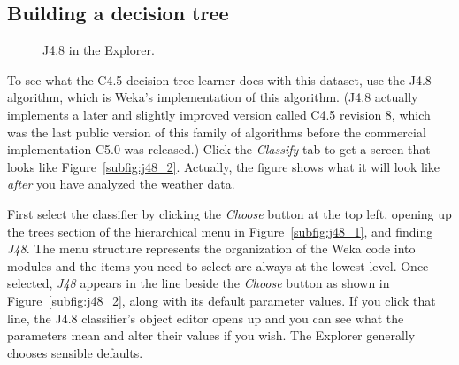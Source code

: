 \subsection{Building a decision tree}
\label{subsection:building_decision_tree}

\begin{figure}[!th]
\centering
{}
\qquad
{}
\caption{\label{fig:j48_explorer}J4.8 in the Explorer.}
\end{figure}

To see what the C4.5 decision tree learner does with this dataset, use
the J4.8 algorithm, which is Weka’s implementation of this
algorithm. (J4.8 actually implements a later and slightly improved
version called C4.5 revision 8, which was the last public version of
this family of algorithms before the commercial implementation C5.0
was released.) Click the \textit{Classify} tab to get a screen that
looks like Figure~\ref{subfig:j48_2}. Actually, the figure shows what
it will look like \textit{after} you have analyzed the weather data.

First select the classifier by clicking the \textit{Choose} button at
the top left, opening up the trees section of the hierarchical menu in
Figure~\ref{subfig:j48_1}, and finding \textit{J48}. The menu
structure represents the organization of the Weka code into modules
and the items you need to select are always at the lowest level. Once
selected, \textit{J48} appears in the line beside the \textit{Choose}
button as shown in Figure~\ref{subfig:j48_2}, along with its default parameter
values. If you click that line, the J4.8 classifier’s object editor
opens up and you can see what the parameters mean and alter their
values if you wish. The Explorer generally chooses sensible defaults.

